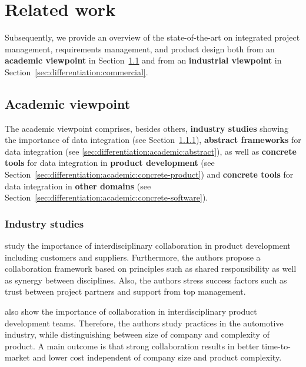 \section{Related work}
\label{sec:differentiation}

Subsequently, we provide an overview of the state-of-the-art on integrated project management, requirements management, and product design both from an \textbf{academic viewpoint} in Section~\ref{sec:differentiation:academic} and from an \textbf{industrial viewpoint} in Section~\ref{sec:differentiation:commercial}.

\subsection{Academic viewpoint}
\label{sec:differentiation:academic}

The academic viewpoint comprises, besides others, \textbf{industry studies} showing the importance of data integration (see Section~\ref{sec:differentiation:academic:industry}), \textbf{abstract frameworks} for data integration (see \ref{sec:differentiation:academic:abstract}), as well as \textbf{concrete tools} for data integration in \textbf{product development} (see Section~\ref{sec:differentiation:academic:concrete-product}) and \textbf{concrete tools} for data integration in \textbf{other domains} (see Section~\ref{sec:differentiation:academic:concrete-software}).

\subsubsection{Industry studies}
\label{sec:differentiation:academic:industry}

\cite{Jassawalla} study the importance of interdisciplinary collaboration in product development including customers and suppliers.
Furthermore, the authors propose a collaboration framework based on principles such as shared responsibility as well as synergy between disciplines.
Also, the authors stress success factors such as trust between project partners and support from top management.

\cite{sanchez2003flexibility} also show the importance of collaboration in interdisciplinary product development teams.
Therefore, the authors study practices in the automotive industry, while distinguishing between size of company and complexity of product.
A main outcome is that strong collaboration results in better time-to-market and lower cost independent of company size and product complexity.


